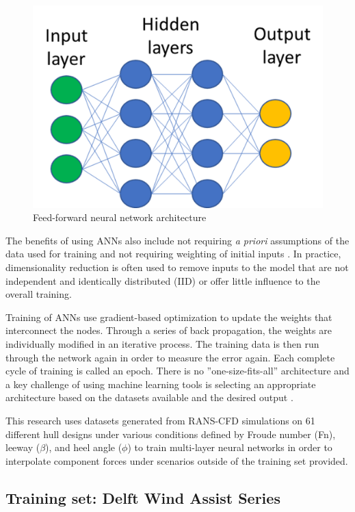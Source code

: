 \documentclass[twoside,twocolumn]{article}
\begin{document}
\begin{figure}[!ht]
	\centering
	\includegraphics[width=.6\columnwidth]{images/ffnn.png}  %
	\caption{Feed-forward neural network architecture}
	\label{fig:ffnn}
\end{figure}
%

The benefits of using ANNs also include not requiring \textit{a priori} assumptions of the data used for training and not requiring weighting of initial inputs \citep{Gardner1998}. In practice, dimensionality reduction is often used to remove inputs to the model that are not independent and identically distributed (IID) or offer little influence to the overall training. 

Training of ANNs use gradient-based optimization to update the weights that interconnect the nodes. Through a series of back propagation, the weights are individually modified in an iterative process. The training data is then run through the network again in order to measure the error again. Each complete cycle of training is called an epoch. There is no ''one-size-fits-all'' architecture and a key challenge of using machine learning tools is selecting an appropriate architecture based on the datasets available and the desired output \citep{Wolpert1997}.

This research uses datasets generated from RANS-CFD simulations on 61 different hull designs under various conditions defined by Froude number (Fn), leeway ($\beta$), and heel angle ($\phi$) to train multi-layer neural networks in order to interpolate component forces under scenarios outside of the training set provided. 


\subsection{Training set: Delft Wind Assist Series}
\end{document}

